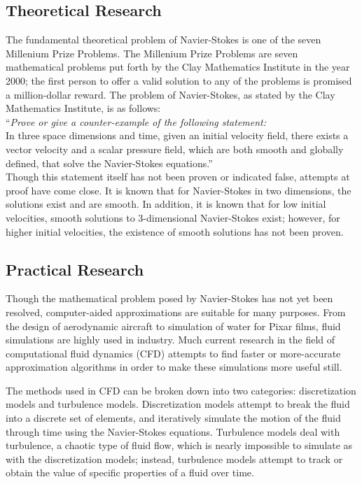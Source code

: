 \documentclass[a4paper,twocolumn]{article}
\begin{document}
\subsection{Theoretical Research}
The fundamental theoretical problem of Navier-Stokes is one of the seven Millenium Prize Problems. The Millenium Prize Problems are seven mathematical problems put forth by the Clay Mathematics Institute in the year 2000; the first person to offer a valid solution to any of the problems is promised a million-dollar reward. The problem of Navier-Stokes, as stated by the Clay Mathematics Institute, is as follows:\\


``\emph{Prove or give a counter-example of the following statement:}\\

In three space dimensions and time, given an initial velocity field, there exists a vector velocity and a scalar pressure field, which are both smooth and globally defined, that solve the Navier-Stokes equations.''\\


Though this statement itself has not been proven or indicated false, attempts at proof have come close. It is known that for Navier-Stokes in two dimensions, the solutions exist and are smooth. In addition, it is known that for low initial velocities, smooth solutions to 3-dimensional Navier-Stokes exist; however, for higher initial velocities, the existence of smooth solutions has not been proven. 

\subsection{Practical Research}
Though the mathematical problem posed by Navier-Stokes has not yet been resolved, computer-aided approximations are suitable for many purposes. From the design of aerodynamic aircraft to simulation of water for Pixar films, fluid simulations are highly used in industry. Much current research in the field of computational fluid dynamics (CFD) attempts to find faster or more-accurate approximation algorithms in order to make these simulations more useful still.

The methods used in CFD can be broken down into two categories: discretization models and turbulence models. Discretization models attempt to break the fluid into a discrete set of elements, and iteratively simulate the motion of the fluid through time using the Navier-Stokes equations. Turbulence models deal with turbulence, a chaotic type of fluid flow, which is nearly impossible to simulate as with the discretization models; instead, turbulence models attempt to track or obtain the value of specific properties of a fluid over time.
\end{document}
